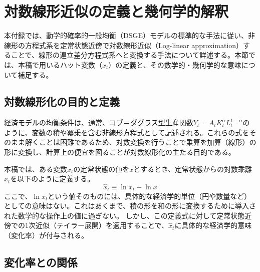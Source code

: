 
\chapter{対数線形近似の定義と幾何学的解釈}
\label{chap:appendix_log_linearization}

本付録では、動学的確率的一般均衡（DSGE）モデルの標準的な手法に従い、非線形の方程式系を定常状態近傍で対数線形近似（Log-linear approximation）することで、線形の連立差分方程式系へと変換する手法について詳述する。本節では、本稿で用いるハット変数（\(\hat{x}_t\)）の定義と、その数学的・幾何学的な意味について補足する。

\section{対数線形化の目的と定義}
\label{sec:appendix_log_linearization_purpose}

経済モデルの均衡条件は、通常、コブ＝ダグラス型生産関数\(Y_t=A_tK_t^\alpha L_t^{1-\alpha}\)のように、変数の積や冪乗を含む非線形方程式として記述される。これらの式をそのまま解くことは困難であるため、対数変換を行うことで乗算を加算（線形）の形に変換し、計算上の便宜を図ることが対数線形化の主たる目的である。

本稿では、ある変数\(x_t\)の定常状態の値を\(x\)とするとき、定常状態からの対数乖離\(\hat{x}_t\)を以下のように定義する。
\begin{equation}
    \hat{x}_t\equiv\ln x_t-\ln x
    \label{eq:appendix_log_linearization_purpose_hat_definition}
\end{equation}
ここで、\(\ln x_t\)という値そのものには、具体的な経済学的単位（円や数量など）としての意味はない。これはあくまで、積の形を和の形に変換するために導入された数学的な操作上の値に過ぎない。
しかし、この定義式に対して定常状態近傍での1次近似（テイラー展開）を適用することで、\(\hat{x}_t\)に具体的な経済学的意味（変化率）が付与される。

\section{変化率との関係}
\label{sec:appendix_log_linearization_rate}

